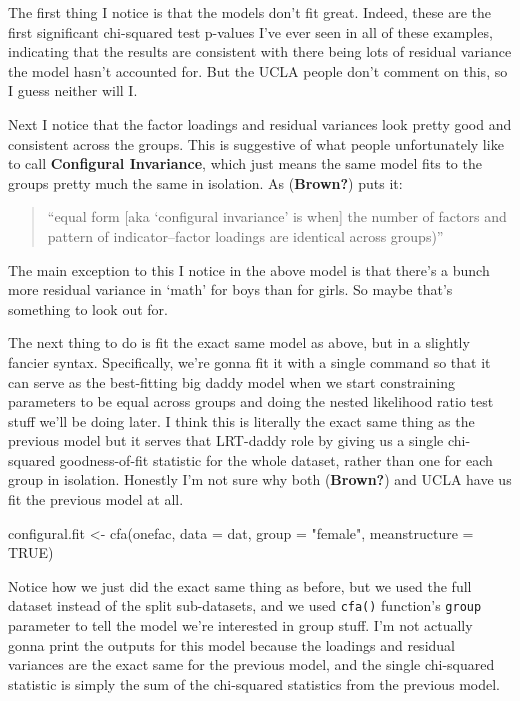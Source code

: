 \documentclass[
  letterpaper,
  DIV=11,
  numbers=noendperiod]{scrreprt}
\newenvironment{Shaded}{\begin{snugshade}}{\end{snugshade}}
\newcommand{\AttributeTok}[1]{\textcolor[rgb]{0.40,0.45,0.13}{#1}}
\newcommand{\ConstantTok}[1]{\textcolor[rgb]{0.56,0.35,0.01}{#1}}
\newcommand{\FunctionTok}[1]{\textcolor[rgb]{0.28,0.35,0.67}{#1}}
\newcommand{\NormalTok}[1]{\textcolor[rgb]{0.00,0.23,0.31}{#1}}
\newcommand{\OtherTok}[1]{\textcolor[rgb]{0.00,0.23,0.31}{#1}}
\newcommand{\StringTok}[1]{\textcolor[rgb]{0.13,0.47,0.30}{#1}}
\begin{document}
The first thing I notice is that the models don't fit great. Indeed,
these are the first significant chi-squared test p-values I've ever seen
in all of these examples, indicating that the results are consistent
with there being lots of residual variance the model hasn't accounted
for. But the UCLA people don't comment on this, so I guess neither will
I.

Next I notice that the factor loadings and residual variances look
pretty good and consistent across the groups. This is suggestive of what
people unfortunately like to call \textbf{Configural Invariance}, which
just means the same model fits to the groups pretty much the same in
isolation. As (\textbf{Brown?}) puts it:

\begin{quote}
``equal form {[}aka `configural invariance' is when{]} the number of
factors and pattern of indicator--factor loadings are identical across
groups)''
\end{quote}

The main exception to this I notice in the above model is that there's a
bunch more residual variance in `math' for boys than for girls. So maybe
that's something to look out for.

The next thing to do is fit the exact same model as above, but in a
slightly fancier syntax. Specifically, we're gonna fit it with a single
command so that it can serve as the best-fitting big daddy model when we
start constraining parameters to be equal across groups and doing the
nested likelihood ratio test stuff we'll be doing later. I think this is
literally the exact same thing as the previous model but it serves that
LRT-daddy role by giving us a single chi-squared goodness-of-fit
statistic for the whole dataset, rather than one for each group in
isolation. Honestly I'm not sure why both (\textbf{Brown?}) and UCLA
have us fit the previous model at all.

\begin{Shaded}
\begin{Highlighting}[]
\NormalTok{configural.fit }\OtherTok{\textless{}{-}} \FunctionTok{cfa}\NormalTok{(onefac, }\AttributeTok{data =}\NormalTok{ dat, }\AttributeTok{group =} \StringTok{"female"}\NormalTok{, }\AttributeTok{meanstructure =} \ConstantTok{TRUE}\NormalTok{)}
\end{Highlighting}
\end{Shaded}

Notice how we just did the exact same thing as before, but we used the
full dataset instead of the split sub-datasets, and we used
\texttt{cfa()} function's \texttt{group} parameter to tell the model
we're interested in group stuff. I'm not actually gonna print the
outputs for this model because the loadings and residual variances are
the exact same for the previous model, and the single chi-squared
statistic is simply the sum of the chi-squared statistics from the
previous model.
\end{document}
